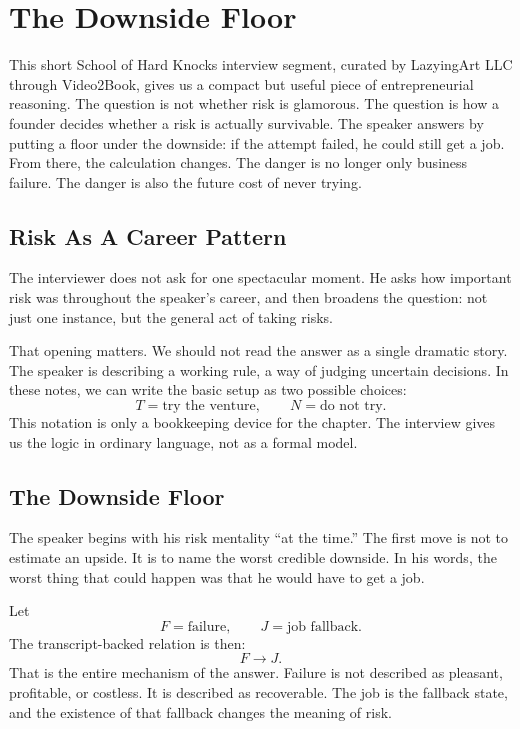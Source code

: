 \chapter{The Downside Floor}

This short School of Hard Knocks interview segment, curated by LazyingArt LLC through Video2Book, gives us a compact but useful piece of entrepreneurial reasoning. The question is not whether risk is glamorous. The question is how a founder decides whether a risk is actually survivable. The speaker answers by putting a floor under the downside: if the attempt failed, he could still get a job. From there, the calculation changes. The danger is no longer only business failure. The danger is also the future cost of never trying.

\section{Risk As A Career Pattern}

The interviewer does not ask for one spectacular moment. He asks how important risk was throughout the speaker's career, and then broadens the question: not just one instance, but the general act of taking risks.

That opening matters. We should not read the answer as a single dramatic story. The speaker is describing a working rule, a way of judging uncertain decisions. In these notes, we can write the basic setup as two possible choices:
\begin{equation}
T = \text{try the venture},
\qquad
N = \text{do not try}.
\end{equation}
This notation is only a bookkeeping device for the chapter. The interview gives us the logic in ordinary language, not as a formal model.

\section{The Downside Floor}

The speaker begins with his risk mentality ``at the time.'' The first move is not to estimate an upside. It is to name the worst credible downside. In his words, the worst thing that could happen was that he would have to get a job.

Let
\[
F = \text{failure},
\qquad
J = \text{job fallback}.
\]
The transcript-backed relation is then:
\begin{equation}
F \longrightarrow J.
\end{equation}
That is the entire mechanism of the answer. Failure is not described as pleasant, profitable, or costless. It is described as recoverable. The job is the fallback state, and the existence of that fallback changes the meaning of risk.

